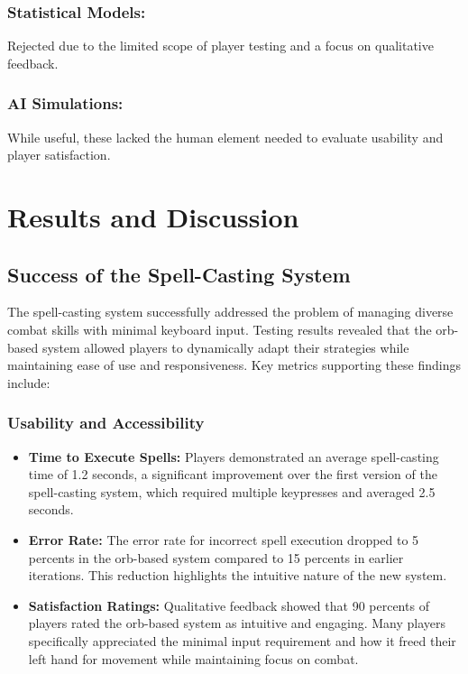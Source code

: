 \documentclass[10pt,twocolumn]{article}
\begin{document}
\subsubsection{Statistical Models:}
Rejected due to the limited scope of player testing and a focus on qualitative feedback.
\subsubsection{AI Simulations:}
While useful, these lacked the human element needed to evaluate usability and player satisfaction.

\section{Results and Discussion}
\subsection{Success of the Spell-Casting System} The spell-casting system successfully addressed the problem of managing diverse combat skills with minimal keyboard input. Testing results revealed that the orb-based system allowed players to dynamically adapt their strategies while maintaining ease of use and responsiveness. Key metrics supporting these findings include:

\subsubsection{Usability and Accessibility} 
\begin{itemize} 
    \item \textbf{Time to Execute Spells:} Players demonstrated an average spell-casting time of 1.2 seconds, a significant improvement over the first version of the spell-casting system, which required multiple keypresses and averaged 2.5 seconds. 
    \item \textbf{Error Rate:} The error rate for incorrect spell execution dropped to 5 percents in the orb-based system compared to 15 percents in earlier iterations. This reduction highlights the intuitive nature of the new system. 
    \item \textbf{Satisfaction Ratings:} Qualitative feedback showed that 90 percents of players rated the orb-based system as intuitive and engaging. Many players specifically appreciated the minimal input requirement and how it freed their left hand for movement while maintaining focus on combat. 
\end{itemize}
\end{document}
